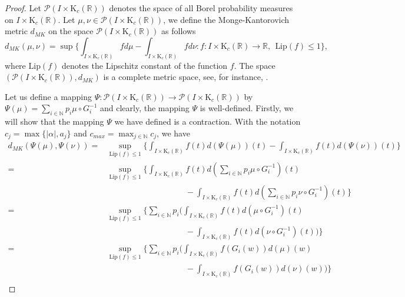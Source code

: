 \documentclass[12pt,oneside,reqno]{amsart}
\theoremstyle{definition}
\theoremstyle{remark}
\begin{document}
\begin{proof}
Let $\mathcal{P}(I\times \mathrm{K}_c(\mathbb{R}))$ denotes the space of all Borel probability measures on $I\times \mathrm{K}_c(\mathbb{R})$. Let $\mu, \nu\in \mathcal{P}(I\times \mathrm{K}_c(\mathbb{R}))$, we define the Monge-Kantorovich metric $d_{MK}$ on the space $\mathcal{P}(I\times \mathrm{K}_c(\mathbb{R}))$ as follows
		$$ d_{MK}(\mu,\nu)=\sup\bigg\{\int_{I\times \mathrm{K}_c(\mathbb{R})}fd\mu-\int_{I\times \mathrm{K}_c(\mathbb{R})}fd\nu: f:I\times \mathrm{K}_c(\mathbb{R})\to\mathbb{R},~~ \text{Lip}(f)\leq1 \bigg\},$$
  where $\text{Lip}(f)$ denotes the Lipschitz constant of the function $f$. The space $(\mathcal{P}(I\times \mathrm{K}_c(\mathbb{R})),d_{MK})$ is a complete metric space, see, for instance, \cite{Bill, Parth}. 
 
  \par Let us define a mapping $\Psi: \mathcal{P}(I\times \mathrm{K}_c(\mathbb{R})) \to \mathcal{P}(I\times \mathrm{K}_c(\mathbb{R}))$ by $\Psi(\mu)=\sum_{i\in \mathbb{N}}p_{i}\mu\circ G_i^{-1}$ and clearly, the mapping $\Psi$ is  well-defined. Firstly, we will show that the mapping $\Psi$ we have defined is a contraction. With the notation $c_j=\max \{\lvert \alpha \rvert,a_j\}$ and $c_{max}= \max_{j \in \mathbb{N}} c_j$, we have
  \begin{equation*}
              \begin{aligned}
               d_{MK}(\Psi(\mu),\Psi(\nu)) =& \sup_{\text{Lip}(f)\leq1}\bigg\{\int_{I\times \mathrm{K}_c(\mathbb{R})}f(t)d(\Psi(\mu))(t)-\int_{I\times \mathrm{K}_c(\mathbb{R})}f(t)d(\Psi(\nu))(t)\bigg\}\\ =& \sup_{\text{Lip}(f)\leq1}\bigg\{\int_{I\times \mathrm{K}_c(\mathbb{R})}f(t)d(\sum_{i\in \mathbb{N}}p_{i}\mu\circ G_i^{-1})(t)\\& \hspace{4cm}-\int_{I\times \mathrm{K}_c(\mathbb{R})}f(t)d(\sum_{i\in \mathbb{N}}p_{i}\nu\circ G_i^{-1})(t)\bigg\}\\
               =& \sup_{\text{Lip}(f)\leq1}\bigg\{\sum_{i\in \mathbb{N}}p_{i} \bigg(\int_{I\times \mathrm{K}_c(\mathbb{R})}f(t)d(\mu\circ G_i^{-1})(t)\\& \hspace{4cm} -\int_{I\times \mathrm{K}_c(\mathbb{R})}f(t)d(\nu\circ G_i^{-1})(t)\bigg)\bigg\}\\ 
               =& \sup_{\text{Lip}(f)\leq1}\bigg\{\sum_{i\in \mathbb{N}}p_{i}\bigg( \int_{I\times \mathrm{K}_c(\mathbb{R})}f(G_i(w))d(\mu)(w) \\& \hspace{4cm} -\int_{I\times \mathrm{K}_c(\mathbb{R})}f(G_i(w))d(\nu)(w)\bigg)\bigg\}\\

\end{aligned}
\end{equation*}
\end{proof}
\end{document}
